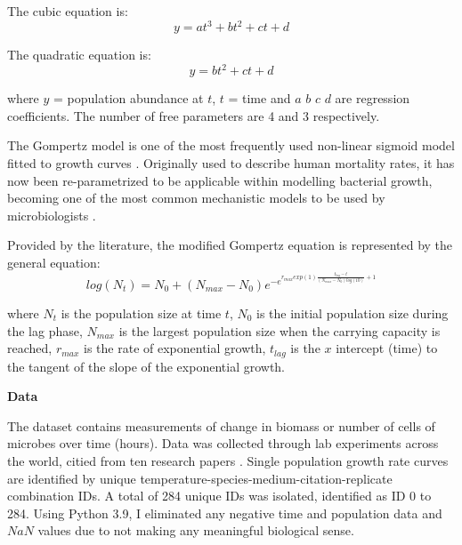 \documentclass[11pt]{article}
\begin{document}
The cubic equation is:
    \begin{equation}
    y = at^3 + bt^2 + ct + d 
    \end{equation}

The quadratic equation is:
    \begin{equation}
    y = bt^2 + ct + d 
    \end{equation}

\noindent where $y$ = population abundance at $t$, $t$ = time and $a$ $b$ $c$ $d$ are regression coefficients. The number of free 
parameters are 4 and 3 respectively. 

The Gompertz model is one of the most frequently used non-linear sigmoid model fitted to growth curves \cite{gompertz_xxiv_1825}. 
Originally used to describe human mortality rates, it has now been re-parametrized to be applicable within 
modelling bacterial growth, becoming one of the most common mechanistic models to be used by microbiologists \cite{tjorve_use_2017,gibson_predicting_1988}.

Provided by the literature, the modified Gompertz equation is represented by the general equation: 
    \begin{equation}    
    log(N_{t}) = N_{0} + (N_{max} - N_{0})e^{-e^{r_{max}exp(1)\frac{t_{lag}-t}{(N_{max} - N_{0})log(10)}+1}}
    \end{equation}
   
\noindent where $N_{t}$ is the population size at time $t$, $N_{0}$ is the initial population size during the lag phase,
$N_{max}$ is the largest population size when the carrying capacity is reached, $r_{max}$ is the rate of exponential growth,
$t_{lag}$ is the $x$ intercept (time) to the tangent of the slope of the exponential growth. 

\noindent\textbf{Data}

The dataset contains measurements of change in biomass or number of cells of microbes over time (hours). Data was collected 
through lab experiments across the world, citied from ten research papers \cite{bae_growth_2014,bernhardt_metabolic_2018,roth_wheaton_1962,galarz_predicting_2016,gill_growth_1991,silva_modelling_2018,sivonen_effects_1990,stannard_temperaturegrowth_1985,zwietering_modeling_1994,phillips_relation_1987}.
Single population growth rate curves are identified by unique temperature-species-medium-citation-replicate combination IDs. A total of 284 
unique IDs was isolated, identified as ID 0 to 284. Using Python 3.9, I eliminated any negative time and population 
data and $NaN$ values due to not making any meaningful biological sense.
\end{document}
